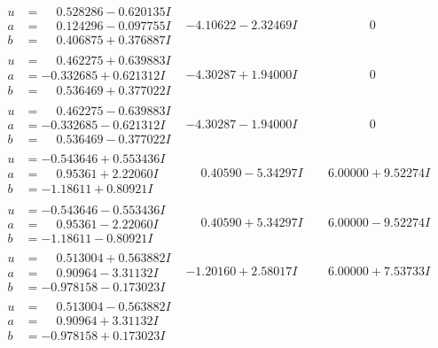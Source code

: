 \documentclass[1p]{elsarticle_modified}
\theoremstyle{definition}
\begin{document}
$$\begin{array}{c|c|c}
\begin{aligned}
u &= \phantom{-}0.528286 - 0.620135 I \\
a &= \phantom{-}0.124296 - 0.097755 I \\
b &= \phantom{-}0.406875 + 0.376887 I\end{aligned}
 & -4.10622 - 2.32469 I & \phantom{-0.000000 } 0 \\ \hline\begin{aligned}
u &= \phantom{-}0.462275 + 0.639883 I \\
a &= -0.332685 + 0.621312 I \\
b &= \phantom{-}0.536469 + 0.377022 I\end{aligned}
 & -4.30287 + 1.94000 I & \phantom{-0.000000 } 0 \\ \hline\begin{aligned}
u &= \phantom{-}0.462275 - 0.639883 I \\
a &= -0.332685 - 0.621312 I \\
b &= \phantom{-}0.536469 - 0.377022 I\end{aligned}
 & -4.30287 - 1.94000 I & \phantom{-0.000000 } 0 \\ \hline\begin{aligned}
u &= -0.543646 + 0.553436 I \\
a &= \phantom{-}0.95361 + 2.22060 I \\
b &= -1.18611 + 0.80921 I\end{aligned}
 & \phantom{-}0.40590 - 5.34297 I & \phantom{-}6.00000 + 9.52274 I \\ \hline\begin{aligned}
u &= -0.543646 - 0.553436 I \\
a &= \phantom{-}0.95361 - 2.22060 I \\
b &= -1.18611 - 0.80921 I\end{aligned}
 & \phantom{-}0.40590 + 5.34297 I & \phantom{-}6.00000 - 9.52274 I \\ \hline\begin{aligned}
u &= \phantom{-}0.513004 + 0.563882 I \\
a &= \phantom{-}0.90964 - 3.31132 I \\
b &= -0.978158 - 0.173023 I\end{aligned}
 & -1.20160 + 2.58017 I & \phantom{-}6.00000 + 7.53733 I \\ \hline\begin{aligned}
u &= \phantom{-}0.513004 - 0.563882 I \\
a &= \phantom{-}0.90964 + 3.31132 I \\
b &= -0.978158 + 0.173023 I\end{aligned}

\end{array}$$
\end{document}
